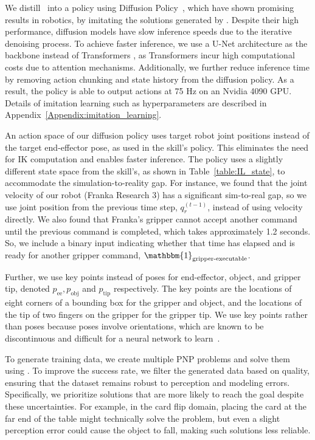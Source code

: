 We distill \skillrrt~into a policy using Diffusion Policy~\cite{chi2023diffusion}, which have shown promising results in robotics, by imitating the solutions generated by \skillrrt. Despite their high performance, diffusion models have slow inference speeds due to the iterative denoising process. To achieve faster inference, we use a U-Net \cite{ronneberger2015u} architecture as the backbone instead of Transformers \cite{vaswani2017attention}, as Transformers incur high computational costs due to attention mechanisms. Additionally, we further reduce inference time by removing action chunking and state history from the diffusion policy. As a result, the policy is able to output actions at 75 Hz on an Nvidia 4090 GPU. Details of imitation learning such as hyperparameters are described in Appendix~\ref{Appendix:imitation_learning}.

An action space of our diffusion policy uses target robot joint positions instead of the target end-effector pose, as used in the skill's policy. This eliminates the need for IK computation and enables faster inference. The policy uses a slightly different state space from the skill's, as shown in Table~\ref{table:IL_state}, to accommodate the simulation-to-reality gap. For instance, we found that the joint velocity of our robot (Franka Research 3) has a significant sim-to-real gap, so we use joint position from the previous time step, $q^{(t-1)}_r$, instead of using velocity directly. We also found that Franka's gripper cannot accept another command until the previous command is completed, which takes approximately 1.2 seconds. So, we include a binary input indicating whether that time has elapsed and is ready for another gripper command, $\mathbbm{1}_\text{gripper-executable}$.

Further, we use key points instead of poses for end-effector, object, and gripper tip, denoted $p_\text{ee}, p_\text{obj}$ and $p_\text{tip}$ respectively. The key points are the locations of eight corners of a bounding box for the gripper and object, and the locations of the tip of two fingers on the gripper for the gripper tip. We use key points rather than poses because poses involve orientations, which are known to be discontinuous and difficult for a neural network to learn~\cite{zhou2019continuity}.



To generate training data, we create multiple PNP problems and solve them using \skillrrt. To improve the success rate, we filter the generated data based on quality, ensuring that the dataset remains robust to perception and modeling errors. Specifically, we prioritize solutions that are more likely to reach the goal despite these uncertainties. For example, in the card flip domain, placing the card at the far end of the table might technically solve the problem, but even a slight perception error could cause the object to fall, making such solutions less reliable.

